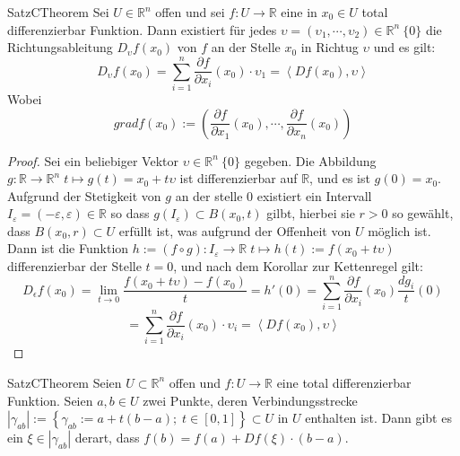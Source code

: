 \begin{ibox}[36]{Satz}{CTheorem}
    Sei $ U \in \mathbb{R}^n  $ offen und sei $ f: U \to \mathbb{R}  $ eine in $ x_0 \in U $ total differenzierbar
	Funktion. Dann existiert für jedes $ \upsilon =  \left( \upsilon_1 , \cdots, \upsilon_2 \right) \in \mathbb{R}^n \ \{0\} $ 
	die Richtungsableitung $ D_{\upsilon}f(x_0) $ von $ f $ an der Stelle $ x_0 $ in Richtug $ \upsilon$ und es gilt:
	$$ D_{\upsilon}f(x_0) = \sum_{i=1}^{n} \frac{\partial f}{\partial x_{i}} (x_0) \cdot \upsilon_1  =
	\left<Df(x_0), \upsilon \right>$$
	Wobei
	$$ grad f(x_0) := \left( \frac{\partial f}{\partial x_1} (x_0)  , \cdots, \frac{\partial f}{\partial x_n} (x_0) \right)$$
\end{ibox}
\begin{proof}
	Sei ein beliebiger Vektor $ \upsilon \in \mathbb{R}^n \ \{0\} $ gegeben. Die Abbildung $ g: \mathbb{R}  \to \mathbb{R}^n 
	 \; t \mapsto g(t) = x_0 + t \upsilon$  ist differenzierbar auf $ \mathbb{R}  $, und es ist $ g(0) = x_0 $. 
	 Aufgrund der Stetigkeit von $ g $ an der stelle $ 0 $ existiert ein Intervall $ I_{\varepsilon} = \left( - \varepsilon 
	 , \varepsilon \right) \in \mathbb{R}  $ so dass $ g \left( I_{ \varepsilon } \right) \subset  B(x_0,t) $ gilbt, hierbei
	 sie $ r > 0 $ so gewählt, dass $ B(x_0, r) \subset U $ erfüllt ist, was aufgrund der Offenheit von $ U $ möglich ist.
	 Dann ist die Funktion $ h:=(f \circ g): I_{ \varepsilon } \to \mathbb{R} \; t \mapsto h(t) := f(x_0+t \upsilon) $ 
	 differenzierbar der Stelle $ t = 0 $, und nach dem Korollar zur Kettenregel gilt:
	 $$ D_{\epsilon}f(x_0) = \lim_{t \to 0} \frac{f(x_0+t \upsilon) - f(x_0)}{t} = h'(0) = 
	 \sum_{i = 1}^{n} \frac{\partial f}{\partial x_{i}} (x_0) \frac{dg_{i}}{t}(0) 
	 $$
	  $$ = \sum_{i=1}^{n} \frac{\partial f}{\partial x_{i}} (x_0) \cdot \upsilon_{i} = \left<Df(x_0), \upsilon \right> $$
	   
\end{proof}
\begin{ibox}[37]{Satz}{CTheorem}
    Seien $ U \subset  \mathbb{R}^n  $ offen und $ f: U \to \mathbb{R}  $ eine total differenzierbar Funktion. Seien $ a,b \in U $
	zwei Punkte, deren Verbindungsstrecke $ \left| \gamma_{ab} \right| := \left\{ \gamma_{ab} := a + t(b-a); \; 
	t \in [0,1] \right\} \subset  U \text{ in } U $ enthalten ist. Dann gibt es ein $ \xi \in \left| \gamma_{ab} \right|  $ 
	derart, dass $ f(b) = f(a)+ Df(\xi) \cdot (b-a)  $.
\end{ibox}
